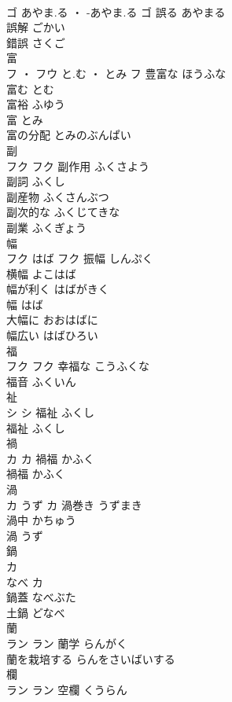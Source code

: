 \documentclass[8pt]{extreport}
\begin{document}
\begin{CJK}{UTF8}{min}
\\	ゴ	あやま.る ・ -あやま.る	ゴ	誤る	あやまる	
\\	誤解	ごかい	
\\	錯誤	さくご	
\\	富	
\\	フ ・ フウ	と.む ・ とみ	フ	豊富な	ほうふな	
\\	富む	とむ	
\\	富裕	ふゆう	
\\	富	とみ	
\\	富の分配	とみのぶんぱい	
\\	副	
\\	フク		フク	副作用	ふくさよう	
\\	副詞	ふくし	
\\	副産物	ふくさんぶつ	
\\	副次的な	ふくじてきな	
\\	副業	ふくぎょう	
\\	幅	
\\	フク	はば	フク	振幅	しんぷく	
\\	横幅	よこはば	
\\	幅が利く	はばがきく	
\\	幅	はば	
\\	大幅に	おおはばに	
\\	幅広い	はばひろい	
\\	福	
\\	フク		フク	幸福な	こうふくな	
\\	福音	ふくいん	
\\	祉	
\\	シ		シ	福祉	ふくし	
\\	福祉	ふくし	
\\	禍	
\\	カ		カ	禍福	かふく	
\\	禍福	かふく	
\\	渦	
\\	カ	うず	カ	渦巻き	うずまき	
\\	渦中	かちゅう	
\\	渦	うず	
\\	鍋	
\\	カ
\\	なべ	カ
\\	鍋蓋	なべぶた	
\\	土鍋	どなべ	
\\	蘭	
\\	ラン		ラン	蘭学	らんがく	
\\	蘭を栽培する	らんをさいばいする	
\\	欄	
\\	ラン		ラン	空欄	くうらん	

\end{CJK}
\end{document}
